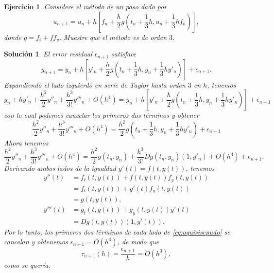 \documentclass[11pt]{article}
\newtheorem{exercise}{Ejercicio}
\newtheorem*{sol}{Solución}
\begin{document}
\begin{exercise}
  Considere el método de un paso dado por
  \begin{equation}
    u_{n+1} = u_n + h \left[
      f_n + \frac{h}{2}g \left(
        t_n + \frac{1}{3}h,
        u_n + \frac{1}{3}hf_n
      \right)
    \right]
  ,\end{equation}
  donde $g=f_t+ff_y$. Muestre que el método es de orden $3$.
\end{exercise}
\begin{sol}
  El error residual $\epsilon_{n+1}$ satisface
  \begin{equation}
    y_{n+1} = y_n + h \left[
      y'_n + \frac{h}{2}g \left(
        t_n + \frac{1}{3}h,
        y_n + \frac{1}{3}hy'_n
      \right)
    \right]
    + \epsilon_{n+1}
  .\end{equation}
  Expandiendo el lado izquierdo en serie de Taylor hasta orden $3$ en
  $h$, tenemos
  \begin{equation}
    y_n + hy'_n + \frac{h^{2}}{2}y''_n + \frac{h^{3}}{3!}y'''_n +
    O(h^{4})
    = y_n + h \left[
      y'_n + \frac{h}{2}g \left(
        t_n + \frac{1}{3}h,
        y_n + \frac{1}{3}hy'_n
      \right)
    \right]
    + \epsilon_{n+1}
  \end{equation}
  con lo cual podemos cancelar los primeros dos términos y obtener
  \begin{equation}
    \frac{h^{2}}{2}y''_n + \frac{h^{3}}{3!}y'''_n +
    O(h^{4})
    = \frac{h^{2}}{2}g \left(
        t_n + \frac{1}{3}h,
        y_n + \frac{1}{3}hy'_n
      \right)
    + \epsilon_{n+1}
  \end{equation}
  Ahora tenemos
  \begin{equation}\label{eq:aquisisepudo}
    \frac{h^{2}}{2}y''_n + \frac{h^{3}}{3!}y'''_n +
    O(h^{4})
    =
    \frac{h^{2}}{2}g(t_n,y_n)
    +
    \frac{h^{3}}{3!}Dg(t_n,y_n)(1,y'_n) + O(h^{4})
    + \epsilon_{n+1}.
  \end{equation}
  Derivando ambos lados de la igualdad $y'(t)=f(t,y(t))$, tenemos
  \begin{align}
    y''(t)
    &= f_t(t,y(t))+f(t,y(t))f_y(t,y(t)) \\
    &= f_t(t,y(t))+y'(t)f_y(t,y(t)) \\
    &= g(t,y(t)),
    \\
    y'''(t)
    &= g_t(t,y(t)) + g_y(t,y(t)) y'(t) \\
    &= Dg(t,y(t))(1,y'(t)).
  \end{align}
  Por lo tanto, los primeros dos términos de cada lado de
  \eqref{eq:aquisisepudo} se cancelan y obtenemos
  $\epsilon_{n+1}=O(h^{4})$, de modo que
  \begin{equation}
    \tau _{n+1}(h) = \frac{\epsilon_{n+1}}{h} = O(h^{3})
  ,\end{equation}
  como se quería.
\end{sol}
\end{document}
